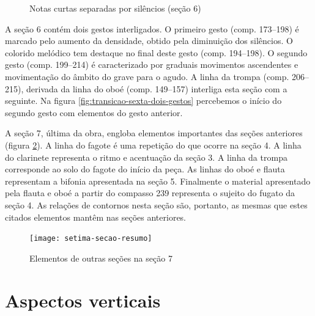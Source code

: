 \begin{figure}
  \centering


  \caption{Notas curtas separadas por silêncios (seção 6)}
  \label{fig:sexta-secao-notas-curtas}
\end{figure}

A seção 6 contém dois gestos interligados. O primeiro gesto
(comp. 173--198) é marcado pelo aumento da densidade, obtido pela
diminuição dos silêncios. O colorido melódico tem destaque no final
deste gesto (comp. 194--198). O segundo gesto (comp. 199--214) é
caracterizado por graduais movimentos ascendentes e movimentação do
âmbito do grave para o agudo. A linha da trompa (comp. 206--215),
derivada da linha do oboé (comp. 149--157) interliga esta seção com a
seguinte. Na figura \ref{fig:transicao-sexta-dois-gestos} percebemos o
início do segundo gesto com elementos do gesto anterior.

A seção 7, última da obra, engloba elementos importantes das seções
anteriores (figura \ref{fig:setima-secao-resumo}). A linha do fagote é
uma repetição do que ocorre na seção 4. A linha do clarinete
representa o ritmo e acentuação da seção 3. A linha da trompa
corresponde ao solo do fagote do início da peça. As linhas do oboé e
flauta representam a bifonia apresentada na seção 5. Finalmente o
material apresentado pela flauta e oboé a partir do compasso 239
representa o sujeito do fugato da seção 4. As relações de contornos
nesta seção são, portanto, as mesmas que estes citados elementos
mantêm nas seções anteriores.

\begin{figure}
  \centering
  \texttt{[image: setima-secao-resumo]}
  \caption{Elementos de outras seções na seção 7}
  \label{fig:setima-secao-resumo}
\end{figure}
\section{Aspectos verticais}
\label{sec:aspectos-verticais}

